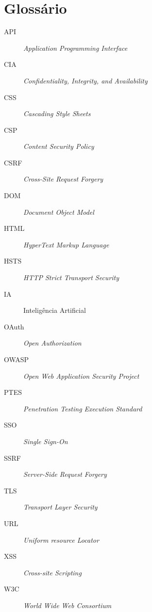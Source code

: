 \section*{Glossário} %

\begin{description}
\item[API] \textit{Application Programming Interface}
\item[CIA] \textit{Confidentiality, Integrity, and Availability}
\item[CSS] \textit{Cascading Style Sheets}
\item[CSP] \textit{Content Security Policy}
\item[CSRF] \textit{Cross-Site Request Forgery}
\item[DOM] \textit{Document Object Model}
\item[HTML] \textit{HyperText Markup Language}
\item[HSTS] \textit{HTTP Strict Transport Security}
\item[IA] Inteligência Artificial
\item[OAuth] \textit{Open Authorization}
\item[OWASP] \textit{Open Web Application Security Project}
\item[PTES] \textit{Penetration Testing Execution Standard}
\item[SSO] \textit{Single Sign-On}
\item[SSRF] \textit{Server-Side Request Forgery}
\item[TLS] \textit{Transport Layer Security}
\item[URL] \textit{Uniform resource Locator}
\item[XSS] \textit{Cross-site Scripting}
\item[W3C] \textit{World Wide Web Consortium}
\end{description}